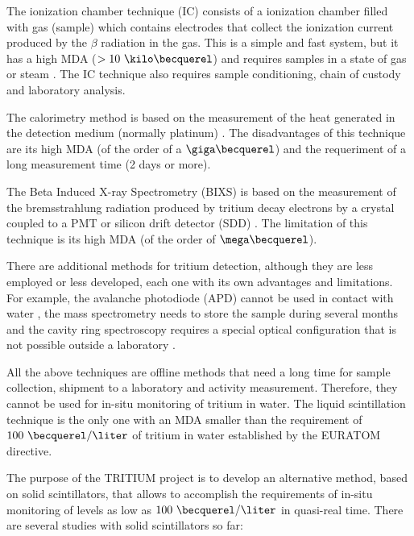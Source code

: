 The ionization chamber technique (IC) consists of a ionization chamber filled with gas (sample) which contains electrodes that collect the ionization current produced by the $\beta$ radiation in the gas. This is a simple and fast system, but it has a high MDA ($> 10~\kilo\becquerel$) and requires samples in a state of gas or steam \cite{IonizationChamber1, IonizationChamber2}. The IC technique also requires sample conditioning, chain of custody and laboratory analysis. 

The calorimetry method is based on the measurement of the heat generated in the detection medium (normally platinum) \cite{Calorimeter1, Calorimeter2}. The disadvantages of this technique are its high MDA (of the order of a $\giga\becquerel$) and the requeriment of a long measurement time (2 days or more).

The Beta Induced X-ray Spectrometry (BIXS) is based on the measurement of the bremsstrahlung radiation produced by tritium decay electrons by a  crystal coupled to a PMT  \cite{XRays1, XRays2} or silicon drift detector (SDD) \cite{Bremstrahlung}. The limitation of this technique is its high MDA (of the order of $\mega\becquerel$).

There are additional methods for tritium detection, although they are less employed or less developed, each one with its own advantages and limitations. For example, the avalanche photodiode (APD) cannot be used in contact with water \cite{APD},  the mass spectrometry needs to store the sample during several months \cite{Spectrometry} and the cavity ring spectroscopy requires a special optical configuration that is not possible outside a laboratory \cite{Ring}.

All the above techniques are offline methods that need a long time for sample collection, shipment to a laboratory and activity measurement. Therefore, they cannot be used for in-situ monitoring of tritium in water. The liquid scintillation technique is the only one with an MDA smaller than the requirement of $100~\becquerel/\liter$ of tritium in water established by the EURATOM directive. 

The purpose of the TRITIUM project is to develop an alternative method, based on solid scintillators, that allows to accomplish the requirements of in-situ monitoring of levels as low as $100~\becquerel/\liter$ in quasi-real time. There are several studies with solid scintillators so far:

